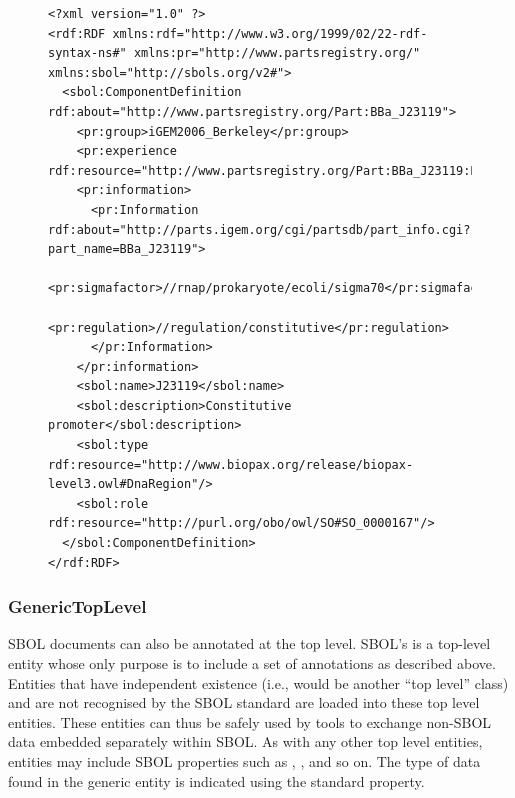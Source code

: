 \begin{figure} [ht]
\begin{lstlisting}
<?xml version="1.0" ?>
<rdf:RDF xmlns:rdf="http://www.w3.org/1999/02/22-rdf-syntax-ns#" xmlns:pr="http://www.partsregistry.org/" xmlns:sbol="http://sbols.org/v2#">
  <sbol:ComponentDefinition rdf:about="http://www.partsregistry.org/Part:BBa_J23119">
    <pr:group>iGEM2006_Berkeley</pr:group>
    <pr:experience rdf:resource="http://www.partsregistry.org/Part:BBa_J23119:Experience"/>
    <pr:information>
      <pr:Information rdf:about="http://parts.igem.org/cgi/partsdb/part_info.cgi?part_name=BBa_J23119">
        <pr:sigmafactor>//rnap/prokaryote/ecoli/sigma70</pr:sigmafactor>
        <pr:regulation>//regulation/constitutive</pr:regulation>
      </pr:Information>
    </pr:information>
    <sbol:name>J23119</sbol:name>
    <sbol:description>Constitutive promoter</sbol:description>
    <sbol:type rdf:resource="http://www.biopax.org/release/biopax-level3.owl#DnaRegion"/>
    <sbol:role rdf:resource="http://purl.org/obo/owl/SO#SO_0000167"/>
  </sbol:ComponentDefinition>
</rdf:RDF>
\end{lstlisting}
\label{ser:Annotation}
\end{figure}




\subsubsection{GenericTopLevel}  
\label{sec:GenericTopLevel}
SBOL documents can also be annotated at the top level. 
SBOL's  is a top-level entity whose only purpose is to include a set of annotations as described above. 
Entities that have independent existence (i.e., would be another ``top level'' class) and are not recognised by the SBOL standard are loaded into these top level entities. 
These  entities can thus be safely used by tools to exchange non-SBOL data embedded separately within SBOL.
As with any other top level entities,  entities may include SBOL properties such as , ,  and so on. The type of data found in the generic entity is indicated using the standard  property.

